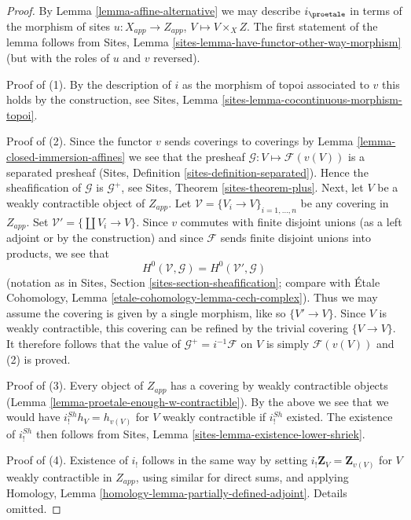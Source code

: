 \begin{proof}
By Lemma \ref{lemma-affine-alternative} we may describe $i_\proetale$ in terms
of the morphism of sites $u : X_{app} \to Z_{app}$, $V \mapsto V \times_X Z$.
The first statement of the lemma follows from
Sites, Lemma \ref{sites-lemma-have-functor-other-way-morphism}
(but with the roles of $u$ and $v$ reversed).

\medskip\noindent
Proof of (1). By the description of $i$ as the morphism of topoi associated
to $v$ this holds by the construction, see
Sites, Lemma \ref{sites-lemma-cocontinuous-morphism-topoi}.

\medskip\noindent
Proof of (2). Since the functor $v$ sends coverings to coverings by
Lemma \ref{lemma-closed-immersion-affines} we see that the presheaf
$\mathcal{G} : V \mapsto \mathcal{F}(v(V))$ is a separated presheaf
(Sites, Definition \ref{sites-definition-separated}). Hence
the sheafification of $\mathcal{G}$ is $\mathcal{G}^+$, see
Sites, Theorem \ref{sites-theorem-plus}. Next, let $V$ be a weakly
contractible object of $Z_{app}$. Let
$\mathcal{V} = \{V_i \to V\}_{i = 1, \ldots, n}$
be any covering in $Z_{app}$. Set $\mathcal{V}' = \{\coprod V_i \to V\}$.
Since $v$ commutes with finite disjoint unions (as a left adjoint or by
the construction) and since $\mathcal{F}$ sends finite disjoint
unions into products, we see that
$$
H^0(\mathcal{V}, \mathcal{G}) = H^0(\mathcal{V}', \mathcal{G})
$$
(notation as in Sites, Section \ref{sites-section-sheafification};
compare with
\'Etale Cohomology, Lemma \ref{etale-cohomology-lemma-cech-complex}).
Thus we may assume the covering is given by a single morphism, like
so $\{V' \to V\}$. Since $V$ is weakly contractible, this covering
can be refined by the trivial covering $\{V \to V\}$.
It therefore follows that the value of $\mathcal{G}^+ = i^{-1}\mathcal{F}$
on $V$ is simply $\mathcal{F}(v(V))$ and (2) is proved.

\medskip\noindent
Proof of (3). Every object of $Z_{app}$ has a covering by weakly
contractible objects (Lemma \ref{lemma-proetale-enough-w-contractible}).
By the above we see that we would have $i^{Sh}_!h_V = h_{v(V)}$ for $V$
weakly contractible if $i^{Sh}_!$ existed. The existence of
$i^{Sh}_!$ then follows from
Sites, Lemma \ref{sites-lemma-existence-lower-shriek}.

\medskip\noindent
Proof of (4). Existence of $i_!$ follows in the same way by setting
$i_!\mathbf{Z}_V = \mathbf{Z}_{v(V)}$ for $V$ weakly contractible in $Z_{app}$,
using similar for direct sums, and applying
Homology, Lemma \ref{homology-lemma-partially-defined-adjoint}.
Details omitted.


\end{proof}
